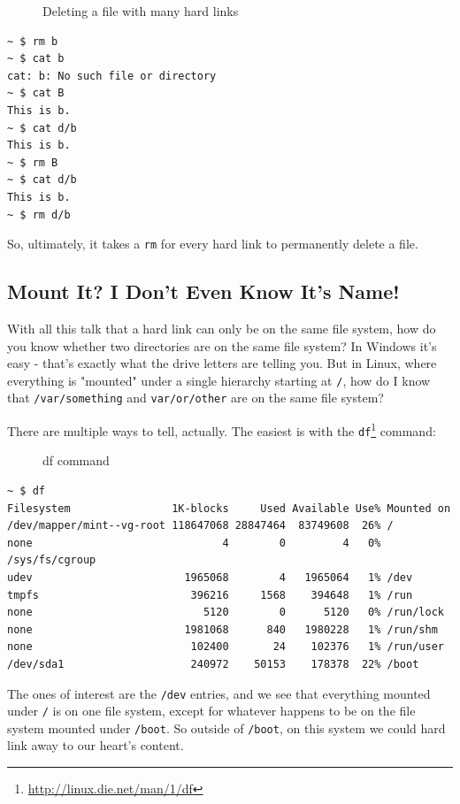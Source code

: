 \documentclass[10pt,]{book}
\renewcommand{\href}[2]{#2\footnote{\url{#1}}}
\numberwithin{figure}{chapter}
\DeclareRobustCommand{\drcap}[1]{\begin{figure}[H]\caption{#1}\end{figure}}
\DeclareRobustCommand{\drcmd}[1]{\index{Commands!#1}}
\begin{document}
\drcap{Deleting a file with many hard links}

\begin{verbatim}
~ $ rm b
~ $ cat b
cat: b: No such file or directory
~ $ cat B
This is b.
~ $ cat d/b
This is b.
~ $ rm B
~ $ cat d/b
This is b.
~ $ rm d/b
\end{verbatim}

So, ultimately, it takes a \texttt{rm} for every hard link to
permanently delete a file.

\subsection*{Mount It? I Don't Even Know It's
Name!}\label{mount-it-i-dont-even-know-its-name}

With all this talk that a hard link can only be on the same file system,
how do you know whether two directories are on the same file system? In
Windows it's easy - that's exactly what the drive letters are telling
you. But in Linux, where everything is "mounted" under a single
hierarchy starting at \texttt{/}, how do I know that
\texttt{/var/something} and \texttt{var/or/other} are on the same file
system?

There are multiple ways to tell, actually. The easiest is with the
\href{http://linux.die.net/man/1/df}{\texttt{df}}\drcmd{df} command:

\drcap{df command}

\begin{verbatim}
~ $ df
Filesystem                1K-blocks     Used Available Use% Mounted on
/dev/mapper/mint--vg-root 118647068 28847464  83749608  26% /
none                              4        0         4   0% /sys/fs/cgroup
udev                        1965068        4   1965064   1% /dev
tmpfs                        396216     1568    394648   1% /run
none                           5120        0      5120   0% /run/lock
none                        1981068      840   1980228   1% /run/shm
none                         102400       24    102376   1% /run/user
/dev/sda1                    240972    50153    178378  22% /boot
\end{verbatim}

The ones of interest are the \texttt{/dev} entries, and we see that
everything mounted under \texttt{/} is on one file system, except for
whatever happens to be on the file system mounted under \texttt{/boot}.
So outside of \texttt{/boot}, on this system we could hard link away to
our heart's content.
\end{document}
